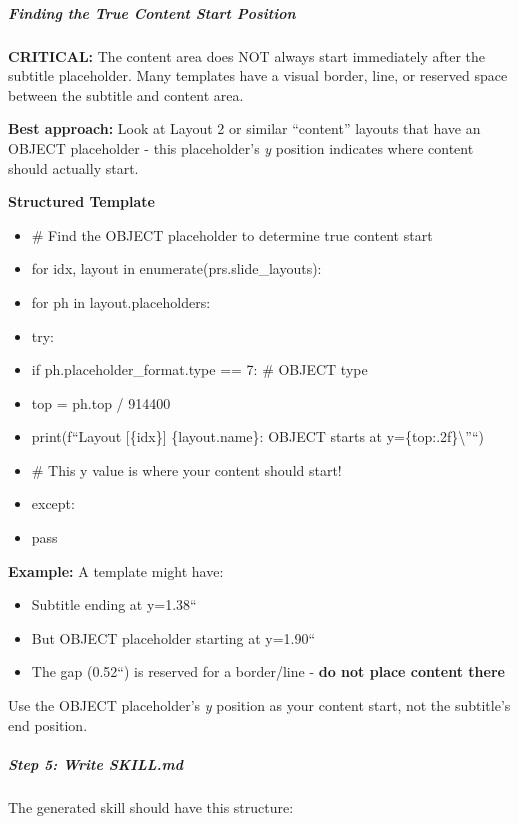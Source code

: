 \documentclass[11pt]{article}
\begin{document}
\subparagraph{Finding the True Content Start Position}\mbox{}\par

\textbf{CRITICAL:} The content area does NOT always start immediately after the subtitle placeholder. Many templates have a visual border, line, or reserved space between the subtitle and content area.


\textbf{Best approach:} Look at Layout 2 or similar ``content'' layouts that have an OBJECT placeholder - this placeholder's \emph{y} position indicates where content should actually start.


\textbf{Structured Template}
\begin{itemize}[leftmargin=*,itemsep=2pt,topsep=2pt]
\item {} \# Find the OBJECT placeholder to determine true content start
\item {} for idx, layout in enumerate(prs.slide\_\allowbreak{}layouts):
\item {} for ph in layout.placeholders:
\item {} try:
\item {} if ph.placeholder\_\allowbreak{}format.type == 7: \# OBJECT type
\item {} top = ph.top / 914400
\item {} print(f``Layout [\{idx\}] \{layout.name\}: OBJECT starts at y=\{top:.2f\}\textbackslash{}''``)
\item {} \# This y value is where your content should start!
\item {} except:
\item {} pass
\end{itemize}

\textbf{Example:} A template might have:

\begin{itemize}[leftmargin=*,itemsep=2pt,topsep=2pt]
\item {} Subtitle ending at y=1.38``
\item {} But OBJECT placeholder starting at y=1.90``
\item {} The gap (0.52``) is reserved for a border/line - \textbf{do not place content there}
\end{itemize}

Use the OBJECT placeholder's \emph{y} position as your content start, not the subtitle's end position.


\subparagraph{Step 5: Write SKILL.md}\mbox{}\par

The generated skill should have this structure:
\end{document}

